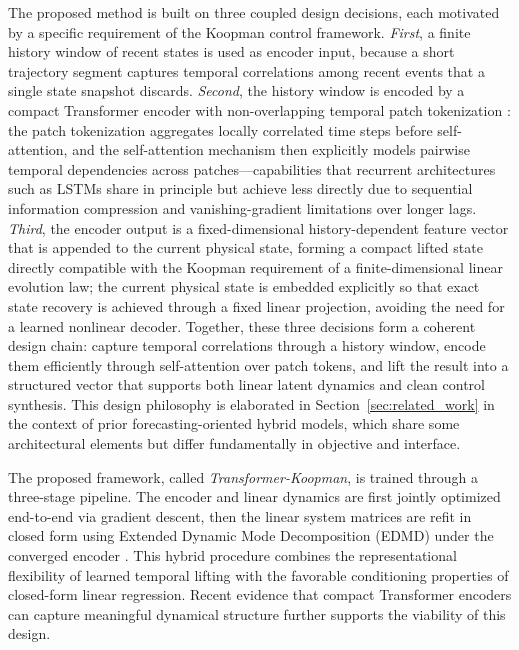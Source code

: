 \documentclass[journal]{IEEEtran}
\begin{document}
The proposed method is built on three coupled design decisions, each motivated by a specific requirement of the Koopman control framework. \emph{First}, a finite history window of recent states is used as encoder input, because a short trajectory segment captures temporal correlations among recent events that a single state snapshot discards. \emph{Second}, the history window is encoded by a compact Transformer encoder with non-overlapping temporal patch tokenization \cite{nie2023time, vaswani2017attention}: the patch tokenization aggregates locally correlated time steps before self-attention, and the self-attention mechanism then explicitly models pairwise temporal dependencies across patches---capabilities that recurrent architectures such as LSTMs share in principle but achieve less directly due to sequential information compression and vanishing-gradient limitations over longer lags. \emph{Third}, the encoder output is a fixed-dimensional history-dependent feature vector that is appended to the current physical state, forming a compact lifted state directly compatible with the Koopman requirement of a finite-dimensional linear evolution law; the current physical state is embedded explicitly so that exact state recovery is achieved through a fixed linear projection, avoiding the need for a learned nonlinear decoder. Together, these three decisions form a coherent design chain: capture temporal correlations through a history window, encode them efficiently through self-attention over patch tokens, and lift the result into a structured vector that supports both linear latent dynamics and clean control synthesis. This design philosophy is elaborated in Section~\ref{sec:related_work} in the context of prior forecasting-oriented hybrid models, which share some architectural elements but differ fundamentally in objective and interface.

The proposed framework, called \emph{Transformer-Koopman}, is trained through a three-stage pipeline. The encoder and linear dynamics are first jointly optimized end-to-end via gradient descent, then the linear system matrices are refit in closed form using Extended Dynamic Mode Decomposition (EDMD) under the converged encoder \cite{williams2015data, proctor2018generalizing}. This hybrid procedure combines the representational flexibility of learned temporal lifting with the favorable conditioning properties of closed-form linear regression. Recent evidence that compact Transformer encoders can capture meaningful dynamical structure \cite{forootani2026compact, forootani2025synthetic} further supports the viability of this design.
\end{document}
